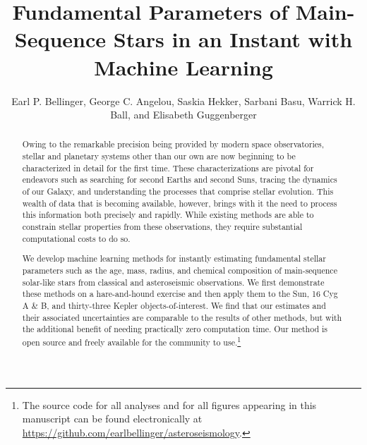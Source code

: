 \documentclass[manuscript]{aastex}
\begin{document}
\title{Fundamental Parameters of Main-Sequence Stars in an Instant with Machine Learning}

\author{Earl P. Bellinger, George C. Angelou, Saskia Hekker, Sarbani Basu, Warrick H. Ball, and Elisabeth Guggenberger}

\begin{abstract}
Owing to the remarkable precision being provided by modern space observatories, stellar and planetary systems other than our own are now beginning to be characterized in detail for the first time. These characterizations are pivotal for endeavors such as searching for second Earths and second Suns, tracing the dynamics of our Galaxy, and understanding the processes that comprise stellar evolution. This wealth of data that is becoming available, however, brings with it the need to process this information both precisely and rapidly. While existing methods are able to constrain stellar properties from these observations, they require substantial computational costs to do so. 

We develop machine learning methods for instantly estimating fundamental stellar parameters such as the age, mass, radius, and chemical composition of main-sequence solar-like stars from classical and asteroseismic observations. We first demonstrate these methods on a hare-and-hound exercise and then apply them to the Sun, 16 Cyg A \& B, and thirty-three Kepler objects-of-interest. We find that our estimates and their associated uncertainties are comparable to the results of other methods, but with the additional benefit of needing practically zero computation time. Our method is open source and freely available for the community to use.\footnote{The source code for all analyses and for all figures appearing in this manuscript can be found electronically at \url{https://github.com/earlbellinger/asteroseismology}.}
\end{abstract}
\end{document}
